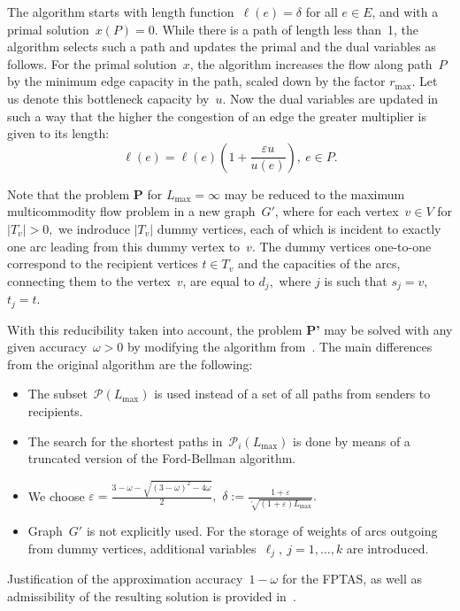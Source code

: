 \documentclass{ifacconf}
\begin{document}
The algorithm starts with length function~$\ell(e)=\delta$ for all
$e\in E$, and with a primal
solution~$x(P)=0$. While there is a path
 of length less than~1, the algorithm selects
such a path and updates the primal and the dual variables as
follows. For the primal solution~$x$, the algorithm increases the
flow along path~$P$ by the minimum edge capacity in the path, scaled
down by the factor $r_{\max}$. Let
us denote this bottleneck capacity by~$u$.
Now the dual variables are updated
in such a way that the higher the congestion of an edge the greater
multiplier is given to its length:
$$
\ell(e) = \ell(e)\left(1 + \frac{\varepsilon u}{u(e)}\right), \
e\in P.
$$



Note that the problem {\bf P} for $L_{\max}=\infty$ may be reduced to
the maximum multicommodity flow problem in a new graph~$G'$,
where for each vertex~$v\in V$ for $|T_v|>0,$ we indroduce
$|T_v|$ dummy vertices, each of which is incident to exactly one
arc leading from this dummy vertex to~$v$. The dummy vertices
one-to-one correspond to the recipient vertices $t \in T_v$
and the capacities of the arcs, connecting them to the vertex~$v$,
are equal to $d_j,$ where $j$ is such that $s_j=v$, $t_j=t$.

With this reducibility taken into account, the problem {\bf P'} may be solved with any given
accuracy~$\omega>0$ by modifying the  algorithm from~\cite{Fleis2000}. The main differences  from the original algorithm are the following:
\begin{itemize}
\item The subset~$\mathcal{P}(L_{\max})$ is used instead of a set of all paths from senders to recipients.
\item The search for the shortest paths in~${\mathcal P}_i(L_{\max})$ is done by means
of a truncated version of the Ford-Bellman algorithm.
\item We choose 
$\varepsilon =\frac{3-\omega-\sqrt{(3-\omega)^2-4\omega}}{2},$
 $\delta:=\frac{1+\varepsilon}{\sqrt[\varepsilon]{(1+\varepsilon)L_{\max}}}.$
\item Graph~$G'$ is not explicitly used. For the storage of
weights of arcs outgoing from dummy vertices, additional
variables~$\ell_{j}, \ j=1,\dots,k$ are introduced.
 \end{itemize}
Justification of the approximation accuracy~$1-\omega$
 for the FPTAS, as well as admissibility
of the resulting solution is provided in~\cite{BEHTV19}.
\end{document}
